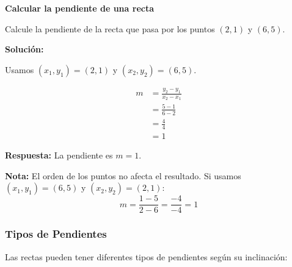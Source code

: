 \begin{example}
\textbf{Calcular la pendiente de una recta}

Calcule la pendiente de la recta que pasa por los puntos $(2, 1)$ y $(6, 5)$.

\textbf{Solución:}

Usamos $(x_1, y_1) = (2, 1)$ y $(x_2, y_2) = (6, 5)$.

\begin{align*}
m &= \frac{y_2 - y_1}{x_2 - x_1} \\
  &= \frac{5 - 1}{6 - 2} \\
  &= \frac{4}{4} \\
  &= 1
\end{align*}

\textbf{Respuesta:} La pendiente es $m = 1$.

\textbf{Nota:} El orden de los puntos no afecta el resultado. Si usamos $(x_1, y_1) = (6, 5)$ y $(x_2, y_2) = (2, 1)$:
$$m = \frac{1 - 5}{2 - 6} = \frac{-4}{-4} = 1$$
\end{example}

\newpage

\subsubsection*{Tipos de Pendientes}

Las rectas pueden tener diferentes tipos de pendientes según su inclinación:

